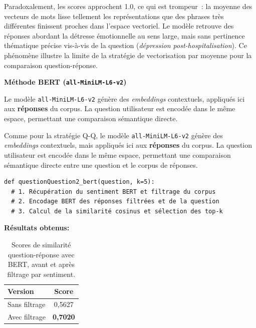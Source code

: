 \documentclass[12pt,a4paper]{report}
\begin{document}
\begin{note}[Interprétation]
Paradoxalement, les scores approchent 1.0, ce qui est trompeur~: la moyenne des vecteurs
de mots lisse tellement les représentations que des phrases très différentes finissent proches
dans l'espace vectoriel. Le modèle retrouve des réponses abordant la détresse émotionnelle au
sens large, mais sans pertinence thématique précise vis-à-vis de la question (\textit{dépression
post-hospitalisation}). Ce phénomène illustre la limite de la stratégie de vectorisation par
moyenne pour la comparaison question-réponse.
\end{note}

\pagebreak

\textbf{Méthode BERT (\texttt{all-MiniLM-L6-v2})}

Le modèle \texttt{all-MiniLM-L6-v2} génère des \textit{embeddings} contextuels, 
appliqués ici aux \textbf{réponses} du corpus. La question utilisateur est encodée dans le même espace,
 permettant une comparaison sémantique directe.

Comme pour la stratégie Q-Q, le modèle \texttt{all-MiniLM-L6-v2} génère des
\textit{embeddings} contextuels, mais appliqués ici aux \textbf{réponses} du corpus.
La question utilisateur est encodée dans le même espace, permettant une comparaison
sémantique directe entre une question et le corpus de réponses.

\begin{lstlisting}
def questionQuestion2_bert(question, k=5):
  # 1. Récupération du sentiment BERT et filtrage du corpus
  # 2. Encodage BERT des réponses filtrées et de la question
  # 3. Calcul de la similarité cosinus et sélection des top-k
\end{lstlisting}

\begin{center}
\textbf{Résultats obtenus:}
\end{center}
\begin{table}[H]
\begin{center}
\begin{tabular}{@{}lc@{}}
  \toprule
  Version & Score \\
  \midrule
  Sans filtrage & 0,5627 \\
  Avec filtrage  & \textbf{0,7020} \\
  \bottomrule
\end{tabular}
\end{center}
\caption{Scores de similarité question-réponse avec BERT, avant et après filtrage par sentiment.}
\end{table}
\end{document}
